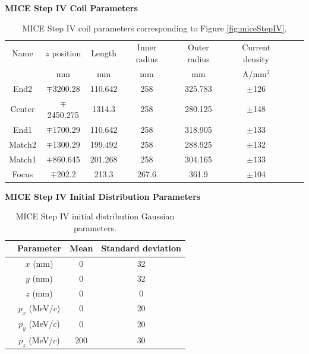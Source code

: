 \begin{table}
\caption*{\textbf{MICE Step IV Coil Parameters}}
\begin{tabularx}{\textwidth}{cccccccc}
\hline \hline
Name & $z$ position & Length & Inner radius & Outer radius & Current density  \vspace{-12pt}\\
 & mm & mm & mm & mm & A/mm$^2$  \\
\hline
	End2 & $\mp$3200.28&110.642&258&325.783&$\pm$126 \vspace{-12pt}\\
	Center&$\mp$2450.275&1314.3&258&280.125&$\pm$148 \vspace{-12pt}\\
	End1 & $\mp$1700.29& 110.642& 258 & 318.905 & $\pm$133 \vspace{-12pt}\\
	Match2 & $\mp$1300.29 & 199.492 & 258 & 288.925 & $\pm$132 \vspace{-12pt}\\
	Match1 & $\mp$860.645 & 201.268 & 258 & 304.165 & $\pm133$ \vspace{-12pt}\\
	Focus & $\mp$202.2 & 213.3 & 267.6 & 361.9 & $\pm$104 \\ 
\hline
\end{tabularx}
\caption[MICE Step IV coil parameters.]{MICE Step IV coil parameters corresponding to Figure \ref{fig:miceStepIV}.}
\label{tbl:MICE_coil_parameters}
\end{table}

\begin{table}
\caption*{\textbf{MICE Step IV Initial Distribution Parameters}}
\begin{center}
\begin{tabularx}{0.7\textwidth}{p{1cm}ccc}
\hline \hline
&Parameter & Mean & Standard deviation \\
\hline
	&$x$ (mm) & 0 & 32\vspace{-12pt}\\
	&$y$ (mm) & 0 & 32\vspace{-12pt} \\
	&$z$ (mm) & 0 & 0\vspace{-12pt} \\
	&$p_x$ (MeV/$c$) & 0 & 20\vspace{-12pt} \\
	&$p_y$ (MeV/$c$) & 0 & 20\vspace{-12pt} \\
	&$p_z$ (MeV/$c$) & 200 & 30\\
\hline
\end{tabularx}
\end{center}
\caption{MICE Step IV initial distribution Gaussian parameters.}
\label{tbl:MICE_initial_distribution_parameters}
\end{table}


